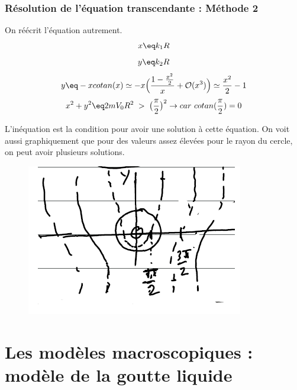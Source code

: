 \subsubsection{Résolution de l'équation transcendante : Méthode 2}
On réécrit l'équation autrement.
\begin{equation*}
    x \eq k_1R
\end{equation*}
\begin{equation*}
    y \eq k_2 R
\end{equation*}
\begin{equation*}
    y \eq -x cotan(x) \simeq -x \Big( \frac{1-\frac{x^2}{2}}{x} + \mathcal{O}(x^3) \Big) \simeq \frac{x^2}{2} -1
\end{equation*}
\begin{equation*}
    x^2 + y^2 \eq 2mV_0R^2 \; > \; \big(\frac{\pi}{2}\big)^2 \rightarrow car\ cotan(\frac{\pi}{2}) = 0
\end{equation*}

L'inéquation est la condition pour avoir une solution à cette équation. On voit aussi graphiquement que pour des valeurs assez élevées pour le rayon du cercle, on peut avoir plusieurs solutions.
\begin{figure}[H]
    \centering
    \includegraphics[scale=1.2]{Images4/EqTranscendante.PNG}
\end{figure}











\section{Les modèles macroscopiques : modèle de la goutte liquide}


